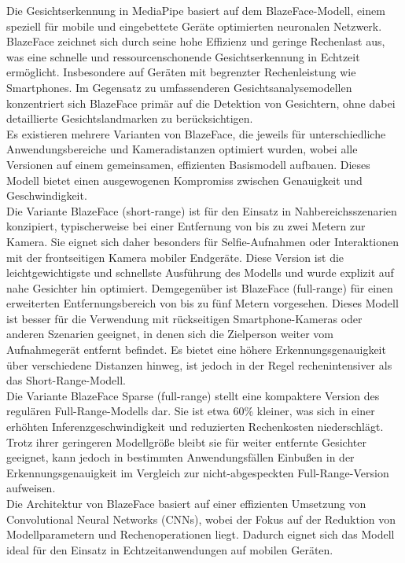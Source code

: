 Die Gesichtserkennung in MediaPipe basiert auf dem BlazeFace-Modell, einem speziell für mobile und eingebettete Geräte optimierten neuronalen Netzwerk. BlazeFace zeichnet sich durch seine hohe Effizienz und geringe Rechenlast aus, was eine schnelle und ressourcenschonende Gesichtserkennung in Echtzeit ermöglicht. Insbesondere auf Geräten mit begrenzter Rechenleistung wie Smartphones. Im Gegensatz zu umfassenderen Gesichtsanalysemodellen konzentriert sich BlazeFace primär auf die Detektion von Gesichtern, ohne dabei detaillierte Gesichtslandmarken zu berücksichtigen. \\
Es existieren mehrere Varianten von BlazeFace, die jeweils für unterschiedliche Anwendungsbereiche und Kameradistanzen optimiert wurden, wobei alle Versionen auf einem gemeinsamen, effizienten Basismodell aufbauen. Dieses Modell bietet einen ausgewogenen Kompromiss zwischen Genauigkeit und Geschwindigkeit. \\
Die Variante BlazeFace (short-range) ist für den Einsatz in Nahbereichsszenarien konzipiert, typischerweise bei einer Entfernung von bis zu zwei Metern zur Kamera. Sie eignet sich daher besonders für Selfie-Aufnahmen oder Interaktionen mit der frontseitigen Kamera mobiler Endgeräte. Diese Version ist die leichtgewichtigste und schnellste Ausführung des Modells und wurde explizit auf nahe Gesichter hin optimiert.
Demgegenüber ist BlazeFace (full-range) für einen erweiterten Entfernungsbereich von bis zu fünf Metern vorgesehen. Dieses Modell ist besser für die Verwendung mit rückseitigen Smartphone-Kameras oder anderen Szenarien geeignet, in denen sich die Zielperson weiter vom Aufnahmegerät entfernt befindet. Es bietet eine höhere Erkennungsgenauigkeit über verschiedene Distanzen hinweg, ist jedoch in der Regel rechenintensiver als das Short-Range-Modell. \\
Die Variante BlazeFace Sparse (full-range) stellt eine kompaktere Version des regulären Full-Range-Modells dar. Sie ist etwa 60\% kleiner, was sich in einer erhöhten Inferenzgeschwindigkeit und reduzierten Rechenkosten niederschlägt. Trotz ihrer geringeren Modellgröße bleibt sie für weiter entfernte Gesichter geeignet, kann jedoch in bestimmten Anwendungsfällen Einbußen in der Erkennungsgenauigkeit im Vergleich zur nicht-abgespeckten Full-Range-Version aufweisen. \\
Die Architektur von BlazeFace basiert auf einer effizienten Umsetzung von Convolutional Neural Networks (CNNs), wobei der Fokus auf der Reduktion von Modellparametern und Rechenoperationen liegt. Dadurch eignet sich das Modell ideal für den Einsatz in Echtzeitanwendungen auf mobilen Geräten. \\
